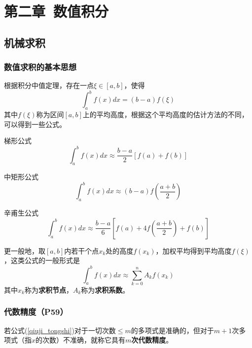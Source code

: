 \documentclass[fontset=ubuntu]{ctexart}
\numberwithin{equation}{section}
\numberwithin{theorem}{section}
\begin{document}

\section{第二章\ 数值积分}

\begin{multicols}{2}
    \subsection{机械求积}

    \subsubsection{数值求积的基本思想}

    根据积分中值定理，存在一点$\xi\in[a,b]$，使得
    \begin{equation}
        \int_{a}^{b}f(x)dx=(b-a)f(\xi)
    \end{equation}
    其中$f(\xi)$称为区间$[a,b]$上的平均高度，根据这个平均高度的估计方法的不同，可以得到一些公式。

    梯形公式
    \begin{equation}
        \int_{a}^{b}f(x)dx\approx \frac{b-a}{2}\left[f(a)+f(b) \right ]
    \end{equation}

    中矩形公式
    \begin{equation}
        \int_{a}^{b}f(x)dx\approx (b-a)f\left(\frac{a+b}{2} \right )
    \end{equation}

    辛甫生公式
    \begin{equation}
        \int_{a}^{b}f(x)dx\approx \frac{b-a}{6}\left[f(a)+4f\left(\frac{a+b}{2} \right )+f(b) \right ]
    \end{equation}

    更一般地，取$[a,b]$内若干个点$x_k$处的高度$f(x_k)$，加权平均得到平均高度$f(\xi)$，这类公式的一般形式是
    \begin{equation}
        \label{qiuji_tongshi}
        \int_{a}^{b}f(x)dx\approx \sum_{k=0}^{n}A_kf(x_k)
    \end{equation}
    其中$x_k$称为\textbf{求积节点}，$A_k$称为\textbf{求积系数}。

    \subsubsection{代数精度（P59）}

    若公式(\ref{qiuji_tongshi})对于一切次数$\leq m$的多项式是准确的，但对于$m+1$次多项式（指$x$的次数）不准确，就称它具有\textbf{$m$次代数精度}。


\end{multicols}
\end{document}
